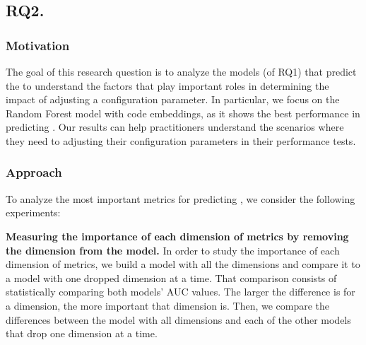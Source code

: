 
\subsection*{\textbf{RQ2. \RQIII}}
\label{sec:rq3}


\subsubsection*{Motivation}
The goal of this research question is to analyze the models (of RQ1) that predict the \inconsistent to understand the factors that play important roles in determining the impact of adjusting a configuration parameter. In particular, we focus on the Random Forest model with code embeddings, as it shows the best performance in predicting \inconsistent. 
Our results can help practitioners understand the scenarios where they need to adjusting their configuration parameters in their performance tests.

\subsubsection*{Approach}


To analyze the most important metrics for predicting \inconsistent, we consider the following experiments:

\noindent\textbf{Measuring the importance of each dimension of metrics by removing the dimension from the model.} 
In order to study the importance of each dimension of metrics, we build a model with all the dimensions and compare it to a model with one dropped dimension at a time. That comparison consists of statistically comparing both models' AUC values. The larger the difference is for a dimension, the more important that dimension is. Then, we compare the differences between the model with all dimensions and each of the other models that drop one dimension at a time. 

